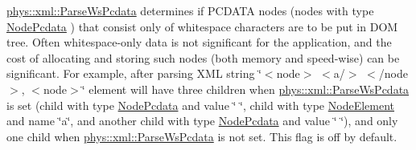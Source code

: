 \begin{DoxyItemize}
\item \hyperlink{namespacephys_1_1xml_a48c0da99d1ed62b1a4984293e64828c6}{phys::xml::ParseWsPcdata} determines if PCDATA nodes (nodes with type \hyperlink{namespacephys_1_1xml_a668b0cc666a9d49f7c7222a7552115d3}{NodePcdata} ) that consist only of whitespace characters are to be put in DOM tree. Often whitespace-\/only data is not significant for the application, and the cost of allocating and storing such nodes (both memory and speed-\/wise) can be significant. For example, after parsing XML string \char`\"{}$<$node$>$ $<$a/$>$ $<$/node$>$, $<$node$>$\char`\"{} element will have three children when \hyperlink{namespacephys_1_1xml_a48c0da99d1ed62b1a4984293e64828c6}{phys::xml::ParseWsPcdata} is set (child with type \hyperlink{namespacephys_1_1xml_a668b0cc666a9d49f7c7222a7552115d3}{NodePcdata} and value \char`\"{} \char`\"{}, child with type \hyperlink{namespacephys_1_1xml_a668b0cc666a9d49f7c7222a7552115d3}{NodeElement} and name \char`\"{}a\char`\"{}, and another child with type \hyperlink{namespacephys_1_1xml_a668b0cc666a9d49f7c7222a7552115d3}{NodePcdata} and value \char`\"{} \char`\"{}), and only one child when \hyperlink{namespacephys_1_1xml_a48c0da99d1ed62b1a4984293e64828c6}{phys::xml::ParseWsPcdata} is not set. This flag is off by default.
\end{DoxyItemize}

